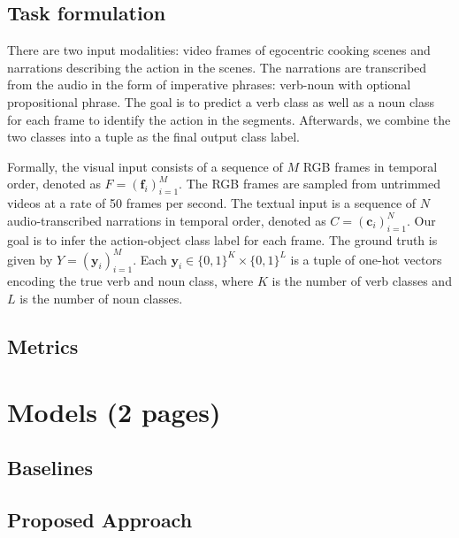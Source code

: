 \documentclass[11pt,a4paper]{article}
\begin{document}
\subsection{Task formulation}
There are two input modalities: video frames of egocentric cooking scenes and narrations describing the action in the scenes. The narrations are transcribed from the audio in the form of imperative phrases: verb-noun with optional propositional phrase. The goal is to predict a verb class as well as a noun class for each frame to identify the action in the segments. Afterwards, we combine the two classes into a tuple as the final output class label. 

Formally, the visual input consists of a sequence of $M$ RGB frames in temporal order, denoted as $F=(\mathbf{f}_i)_{i=1}^M$. The RGB frames are sampled from untrimmed videos at a rate of 50 frames per second. The textual input is a sequence of $N$ audio-transcribed narrations in temporal order, denoted as $C=(\mathbf{c}_i)_{i=1}^N$. Our goal is to infer the action-object class label for each frame. The ground truth is given by $Y=(\mathbf{y}_i)_{i=1}^M$. Each $\mathbf{y}_i\in\{0,1\}^K\times\{0,1\}^L$ is a tuple of one-hot vectors encoding the true verb and noun class, where $K$ is the number of verb classes and $L$ is the number of noun classes.





\subsection{Metrics}



\clearpage
\section{Models (2 pages)}

\subsection{Baselines}



\subsection{Proposed Approach}

\end{document}
